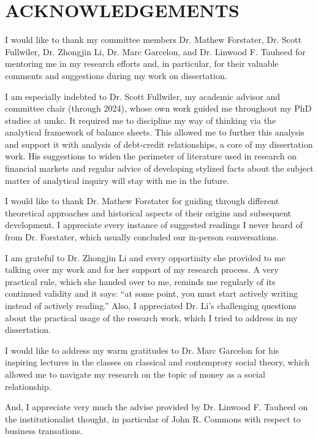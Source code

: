 %
%
\section*{\MakeUppercase{Acknowledgements}}

I would like to thank my committee members Dr. Mathew Forstater, Dr. Scott Fullwiler, Dr. Zhongjin Li, Dr. Marc Garcelon, and Dr. Linwood F. Tauheed for mentoring me in my research efforts and, in particular, for their valuable comments and suggestions during my work on dissertation. 

I am especially indebted to Dr. Scott Fullwiler, my academic advisor and committee chair (through 2024), whose own work guided me throughout my PhD studies at \ac{umkc}. It required me to discipline my way of thinking via the analytical framework of balance sheets. This allowed me to further this analysis and support it with analysis of debt-credit relationships, a core of my dissertation work. His suggestions to widen the perimeter of literature used in research on financial markets and regular advice of developing stylized facts about the subject matter of analytical inquiry will stay with me in the future.  

I would like to thank Dr. Mathew Forstater for guiding through different theoretical approaches and historical aspects of their origins and subsequent development. I appreciate every instance of suggested readings I never heard of from Dr. Forstater, which usually concluded our in-person conversations. 

I am grateful to Dr. Zhongjin Li and every opportinity she provided to me talking over my work and for her support of my research process. A very practical rule, which she handed over to me, reminds me regularly of its continued validity and it says: ``at some point, you must start actively writing instead of actively reading.'' Also, I appreciated Dr. Li's challenging questions about the practical usage of the research work, which I tried to address in my dissertation. 

I would like to address my warm gratitudes to Dr. Marc Garcelon for his inspiring lectures in the classes on classical and contemprory social theory, which allowed me to navigate my research on the topic of money as a social relationship. 

And, I appreciate very much the advise provided by Dr. Linwood F. Tauheed on the institutionalist thought, in particular of John R. Commons with respect to business transations. 

